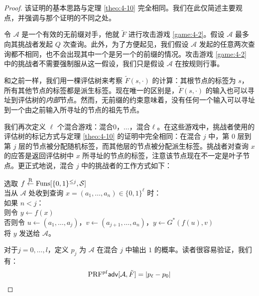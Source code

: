 \begin{proof}
该证明的基本思路与定理 \ref{theo:4-10} 完全相同。我们在此仅简述主要观点，并强调与那个证明的不同之处。

令 $\mathcal{A}$ 是一个有效的无前缀对手，他就 $\tilde F$ 进行攻击游戏 \ref{game:4-2}。假设 $\mathcal{A}$ 最多向其挑战者发起 $Q$ 次查询。此外，为了方便起见，我们假设 $\mathcal{A}$ 发起的任意两次查询都不相同，也不会出现其中一个是另一个的前缀的情况。攻击游戏 \ref{game:4-2} 中的挑战者不需要强制服从这一假设，我们只是假设 $\mathcal{A}$ 在按规则行事。

和之前一样，我们用一棵评估树来考察 $\tilde F(s,\cdot)$ 的计算：其根节点的标签为 $s$，所有其他节点的标签都是派生标签。现在唯一的区别是，$\tilde F(s,\cdot)$ 的输入也可以寻址到评估树的\emph{内部}节点。然而，无前缀的约束意味着，没有任何一个输入可以寻址到一个由之前输入所寻址的节点的祖先节点。

我们再次定义 $\ell$ 个混合游戏：混合$0$，$\dots$，混合$\ell$。在这些游戏中，挑战者使用的评估树的标记方式与定理 \ref{theo:4-10} 的证明中完全相同：在混合 $j$ 中，第 $0$ 层到第 $j$ 层的节点被分配随机标签，而其他层的节点被分配派生标签。挑战者对查询 $x$ 的应答是返回评估树中 $x$ 所寻址的节点的标签，注意该节点现在不一定是叶子节点。更正式地说，混合 $j$ 中的挑战者的工作方式如下：

\vspace{5pt}

\hspace*{5pt} 选取 $f\overset{\rm R}\leftarrow{\rm Funs}[\{0,1\}^{\leq j},\mathcal{S}]$\\
\hspace*{26pt} 当从 $\mathcal{A}$ 处收到查询 $x=(a_1,\dots,a_n)\in\{0,1\}^\ell$ 时：\\
\hspace*{50pt} 如果 $n<j$：\\
\hspace*{75pt} 则令 $y\leftarrow f(x)$\\
\hspace*{75pt} 否则令 $u\leftarrow(a_1,\dots,a_j)$，$v\leftarrow(a_{j+1},\dots,a_n)$，$y\leftarrow G^*(f(u),v)$\\
\hspace*{50pt} 将 $y$ 发送给 $\mathcal{A}$。

\vspace{5pt}

\noindent
对于$j=0,\dots,l$，定义 $p_j$ 为 $\mathcal{A}$ 在混合 $j$ 中输出 $1$ 的概率。读者很容易验证，我们有：
\[
{\rm PRF^{pf}\mathsf{adv}}[\mathcal{A},\tilde{F}]=|p_\ell-p_0|
\]


\end{proof}
